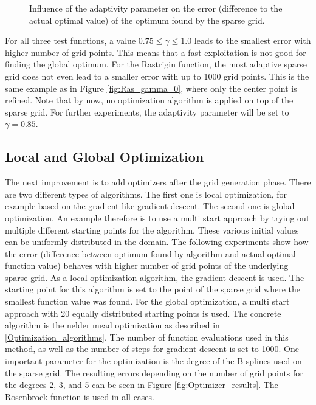 \begin{figure}[htbp!]
	\caption{ Influence of the adaptivity parameter on the error (difference to the actual optimal value) of the optimum found by the sparse grid. }	
	\label{fig:Functions_results}
\end{figure}

For all three test functions, a value $ 0.75 \le \gamma \le 1.0 $ leads to the smallest error with higher number of grid points. This means that a fast exploitation is not good for finding the global optimum. For the Rastrigin function, the most adaptive sparse grid does not even lead to a smaller error with up to 1000 grid points. This is the same example as in Figure \ref{fig:Ras_gamma_0}, where only the center point is refined. Note that by now, no optimization algorithm is applied on top of the sparse grid. For further experiments, the adaptivity parameter will be set to $ \gamma = 0.85 $. \newline 

\subsection{Local and Global Optimization}

The next improvement is to add optimizers after the grid generation phase. There are two different types of algorithms. The first one is local optimization, for example based on the gradient like gradient descent. The second one is global optimization. An example therefore is to use a multi start approach by trying out multiple different starting points for the algorithm. These various initial values can be uniformly distributed in the domain. The following experiments show how the error (difference between optimum found by algorithm and actual optimal function value) behaves with higher number of grid points of the underlying sparse grid. As a local optimization algorithm, the gradient descent is used. The starting point for this algorithm is set to the point of the sparse grid where the smallest function value was found. For the global optimization, a multi start approach with 20 equally distributed starting points is used. The concrete algorithm is the nelder mead optimization as described in \ref{Optimization_algorithms}. The number of function evaluations used in this method, as well as the number of steps for gradient descent is set to 1000. One important parameter for the optimization is the degree of the B-splines used on the sparse grid. The resulting errors depending on the number of grid points for the degrees 2, 3, and 5 can be seen in Figure \ref{fig:Optimizer_results}. The Rosenbrock function is used in all cases.

